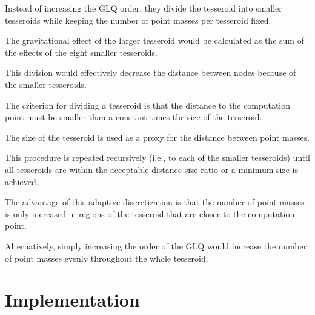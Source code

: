 \documentclass[paper,twocolumn]{geophysics}
\begin{document}
Instead of increasing the GLQ order,
they divide the tesseroid into smaller tesseroids while keeping the number of
point masses per tesseroid fixed.

The gravitational effect of the larger tesseroid would be calculated as the sum
of the effects of the eight smaller tesseroids.

This division would effectively decrease the distance between nodes because of
the smaller tesseroids.

The criterion for dividing a tesseroid is that
the distance to the computation point must be smaller than
a constant times the size of the tesseroid.

The size of the tesseroid is used as a proxy for the distance between point
masses.

This procedure is repeated recursively
(i.e., to each of the smaller tesseroids)
until all tesseroids are within the acceptable distance-size ratio
or a minimum size is achieved.


The advantage of this adaptive discretization is that the number of point
masses is only increased in regions of the tesseroid that are closer to the
computation point.

Alternatively, simply increasing the order of the GLQ would increase the number
of point masses evenly throughout the whole tesseroid.

\section{Implementation}
\end{document}
